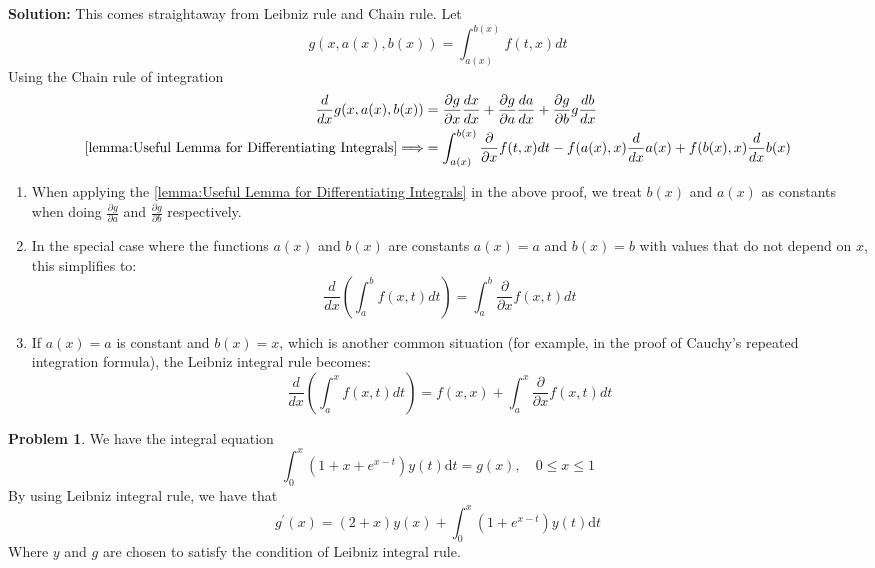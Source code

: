\documentclass[13pt]{article}
\theoremstyle{definition}
\newtheorem{problem}[theorem]{Problem}
\newenvironment{solution}
{\color{C2}\begin{framed}\begingroup\textbf{Solution:} }
  {\endgroup\end{framed}}
\theoremstyle{remark}
\newenvironment{remark}
  {\pushQED{\qed}\renewcommand{\qedsymbol}{$\triangle$}\remarkx}
  {\popQED\endremarkx}
\begin{document}
\begin{solution}
    This comes straightaway from Leibniz rule and Chain rule. Let
$$
g(x, a(x), b(x))=\int_{a(x)}^{b(x)} f(t, x) d t
$$
Using the Chain rule of integration
$$
\begin{aligned}
\frac{d}{d x} g(x, a(x), b(x)) & =\frac{\partial g}{\partial x}  \frac{d x}{d x}+\frac{\partial g}{\partial a} \frac{d a}{d x}+\frac{\partial g}{\partial b} g \frac{d b}{d x} \\
\cref{lemma:Useful Lemma for Differentiating Integrals}\Longrightarrow& =\int_{a(x)}^{b(x)} \frac{\partial}{\partial x} f(t, x) d t-f(a(x), x) \frac{d}{d x} a(x)+f(b(x), x) \frac{d}{d x} b(x)
\end{aligned}
$$
\end{solution}
\begin{remark}\hfill
\begin{enumerate}
\item When applying the \cref{lemma:Useful Lemma for Differentiating Integrals} in the above proof, we treat $b(x)$ and $a(x)$ as constants when doing $\frac{\partial g}{\partial a}$ and $\frac{\partial g}{\partial b}$ respectively.
    \item In the special case where the functions $a(x)$ and $b(x)$ are constants $a(x)=a$ and $b(x)=b$ with values that do not depend on $x$, this simplifies to:
$$
\frac{d}{d x}\left(\int_a^b f(x, t) d t\right)=\int_a^b \frac{\partial}{\partial x} f(x, t) d t
$$
\item If $a(x)=a$ is constant and $b(x)=x$, which is another common situation (for example, in the proof of Cauchy's repeated integration formula), the Leibniz integral rule becomes:
$$
\frac{d}{d x}\left(\int_a^x f(x, t) d t\right)=f(x, x)+\int_a^x \frac{\partial}{\partial x} f(x, t) d t
$$
\end{enumerate}
\end{remark}
\begin{problem}
We have the integral equation
$$
\int_0^x\left(1+x+e^{x-t}\right) y(t) \mathrm{d} t=g(x), \quad 0 \leq x \leq 1
$$
By using Leibniz integral rule, we have that
$$
g^{\prime}(x)=(2+x) y(x)+\int_0^x\left(1+e^{x-t}\right) y(t) \mathrm{d} t
$$
Where $y$ and $g$ are chosen to satisfy the condition of Leibniz integral rule. 
\end{problem}
\end{document}
